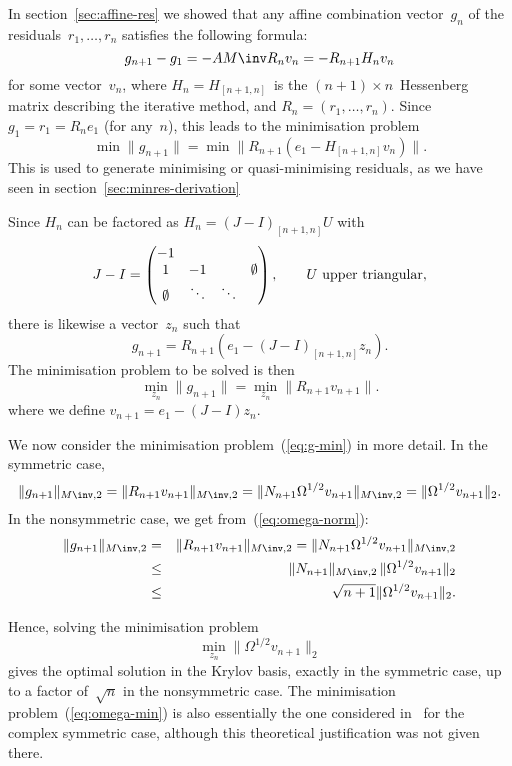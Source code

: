 \documentclass[11pt]{artikel3}
\begin{document}
\begin{Outline}
In section~\ref{sec:affine-res} we showed that any affine combination
vector~$g_n$ of the residuals~$r_1,\ldots,r_n$ satisfies the following
formula: \[ g_{n+1}-g_1=-AM\inv R_nv_n=-R_{n+1}H_nv_n \] for some
vector~$v_n$, where $H_n=H_{[n+1,n]}$~is the $(n+1)\times
n$~Hessenberg matrix describing the iterative method, and
$R_n=(r_1,\ldots,r_n)$.  Since $g_1=r_1=R_ne_1$ (for any~$n$), this
leads to the minimisation problem
\[\min\|g_{n+1}\|=\min\|R_{n+1}(e_1-H_{[n+1,n]}v_n)\|.\]
This is used to generate minimising or quasi-minimising residuals, as
we have seen in section~\ref{sec:minres-derivation}

Since $H_n$ can be factored as $H_n=(J-I)_{[n+1,n]}U$
with
 \[ J-I=\begin{pmatrix}-1\cr 1&-1&&\emptyset\cr \emptyset&\ddots&\ddots\cr\end{pmatrix},\qquad
    \hbox{$U$ upper triangular}, \]
there is likewise a vector~$z_n$ such that
 \begin{equation} g_{n+1}=R_{n+1}(e_1-(J-I)_{[n+1,n]}z_n).
 \label{eq:g-direct}\end{equation}
The minimisation problem to be solved is then
\begin{equation} \min_{z_n}\|g_{n+1}\|=\min_{z_n}\|R_{n+1}v_{n+1}\|.
     \label{eq:g-min}\end{equation}
where we define $v_{n+1}=e_1-(J-I)z_n$.

We now consider the minimisation problem~(\ref{eq:g-min})
in more detail.
In the symmetric case,
 \[ \|g_{n+1}\|_{M\inv,2}=\|R_{n+1}v_{n+1}\|_{M\inv,2}=
        \|N_{n+1}\Omega^{1/2}v_{n+1}\|_{M\inv,2}=
        \|\Omega^{1/2}v_{n+1}\|_2. \]
In the nonsymmetric case, we get from~(\ref{eq:omega-norm}):
 \begin{eqnarray} \|g_{n+1}\|_{M\inv,2}&=&\|R_{n+1}v_{n+1}\|_{M\inv,2}=
    \|N_{n+1}\Omega^{1/2}v_{n+1}\|_{M\inv,2}            \nonumber\\
    &\leq& \|N_{n+1}\|_{M\inv,2}\,\|\Omega^{1/2}v_{n+1}\|_2 \nonumber\\
    &\leq& \sqrt{n+1}\|\Omega^{1/2}v_{n+1}\|_2.
    \label{eq:quasi-bound}\end{eqnarray}

Hence, solving the minimisation problem
 \begin{equation} \min_{z_n}\|\Omega^{1/2}v_{n+1}\|_2
     \label{eq:omega-min}\end{equation}
gives the optimal solution in the Krylov basis,
exactly in the symmetric case,
up to a factor of~$\sqrt{n}$ in the nonsymmetric case.
The minimisation problem~(\ref{eq:omega-min}) is also
essentially the one considered in~\cite{Fr:cgcomplexsymmetric}
for the complex symmetric case,
although this theoretical justification was not given there.


\end{Outline}
\end{document}
